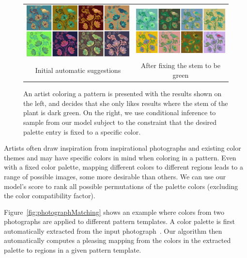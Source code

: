 \begin{figure}[ht]
\begin{tabular}{cc} 
\includegraphics[width=.475\linewidth]{figs/constrainedSearchUnconstrained}&\includegraphics[width=.475\linewidth]{figs/constrainedSearchConstrained}\\
Initial automatic suggestions & After fixing the stem to be green\\
\end{tabular}

\caption{An artist coloring a pattern is presented with the results shown on the left, and decides that she only likes results where the stem of the plant is dark green. On the right, we use conditional inference to sample from our model subject to the constraint that the desired palette entry is fixed to a specific color.}
\label{fig:constrainedInference}
\vspace{-1.0em}
\end{figure}

Artists often draw inspiration from inspirational photographs and existing color themes and may have specific colors in mind when coloring in a pattern. Even with a fixed color palette, mapping different colors to different regions leads to a range of possible images, some more desirable than others. We can use our model's score to rank all possible permutations of the palette colors (excluding the color compatibility factor).

Figure~\ref{fig:photographMatching} shows an example where colors from two photographs are applied to different pattern templates. A color palette is first automatically extracted from the input photograph~\cite{SharonPaletteExtraction}. Our algorithm then automatically computes a pleasing mapping from the colors in the extracted palette to regions in a given pattern template.

